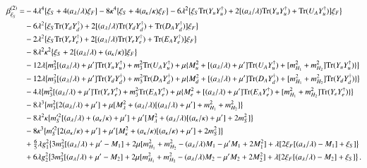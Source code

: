 \documentclass[final,3p,times]{elsarticle}
\newcommand{\lamsq}{\lambda^2}
\newcommand{\kapsq}{\kappa^2}
\newcommand{\tr}{\mathrm{Tr}}
\newcommand{\mhusq}{m^2_{H_2}}
\newcommand{\mhdsq}{m^2_{H_1}}
\newcommand{\mlamsq}{M_\lambda^2}
\newcommand{\mkapsq}{M_\kappa^2}
\newcommand{\mssq}{m_S^2}
\newcommand{\mtrisq}{m_3^2}
\newcommand{\msprsq}{m_S'^2}
\newcommand{\Alam}{a_\lambda/\lambda}
\newcommand{\Akap}{a_\kappa/\kappa}
\newcommand{\Musq}{M_u^2}
\newcommand{\Mdsq}{M_d^2}
\newcommand{\Mesq}{M_e^2}
\begin{document}
\begin{align}
\beta_{\xi^{}_S}^{(2)} =& -4\lambda^4\big\{ \xi_S + 4(\Alam)\xi_F\big\} 
- 8\kappa^4\big\{ \xi_S + 4(\Akap)\xi_F\big\} 
-6\lamsq\big\{ \xi_S\tr( Y_u Y_u^\dagger)+ 2[(\Alam)\tr( Y_u Y_u^\dagger) + \tr( U_A Y_u^\dagger)]\xi_F\big\} \notag \\
%
&-6\lamsq\big\{\xi_S\tr( Y_d Y_d^\dagger) + 2[(\Alam)\tr( Y_d Y_d^\dagger) + \tr( D_A Y_d^\dagger)]\xi_F\big\}  \notag \\
%
&-2\lamsq\big\{\xi_S\tr( Y_e Y_e^\dagger) + 2[(\Alam)\tr( Y_e Y_e^\dagger) + \tr( E_A Y_e^\dagger)]\xi_F\big\} \notag \\
%
&-8\lamsq\kapsq\big\{ \xi_S + 2[(\Alam) + (\Akap)]\xi_F\big\} \notag \\
%
&-12\lambda\big\{ \mtrisq[(\Alam) + \mu']\tr( Y_u Y_u^\dagger) + \mtrisq\tr( U_A Y_u^\dagger)
+ \mu\{\Musq + [(\Alam) + \mu']\tr( U_A Y_u^\dagger) + [\mhdsq + \mhusq]\tr( Y_u Y_u^\dagger)\} \big\} \notag \\
%
&-12\lambda\big\{ \mtrisq[(\Alam) + \mu']\tr( Y_d Y_d^\dagger) + \mtrisq\tr( D_A Y_d^\dagger)
+ \mu\{\Mdsq + [(\Alam) +\mu']\tr( D_A Y_d^\dagger) + [\mhdsq + \mhusq]\tr( Y_d Y_d^\dagger)\} \big\}  \notag \\
%
&-4\lambda\big\{ \mtrisq[(\Alam)+ \mu']\tr( Y_e Y_e^\dagger) + \mtrisq\tr( E_A Y_e^\dagger)
+ \mu\{\Mesq + [(\Alam) +\mu']\tr( E_A Y_e^\dagger) + [\mhdsq + \mhusq]\tr( Y_e Y_e^\dagger)\} \big\} \notag \\
%
&-8\lambda^3\big\{ \mtrisq[2(\Alam) + \mu'] + \mu[\mlamsq + (\Alam)[(\Alam) + \mu'] + \mhdsq + \mhusq]\big\} \notag \\
%
&-8\lamsq\kappa\big\{ \msprsq[(\Alam) + (\Akap) + \mu']
+ \mu'[\mlamsq + (\Alam)[(\Akap) + \mu'] + 2\mssq] \big\} \notag \\
%
&-8\kappa^3\big\{ \msprsq[2(\Akap) + \mu'] 
+ \mu'[\mkapsq + (\Akap)[(\Akap) + \mu'] + 2\mssq] \big\} \notag \\
%
&+ \tfrac{6}{5}\lambda g_1^2\big\{ 3\mtrisq[(\Alam) + \mu' - M_1]
+ 2\mu[\mhdsq + \mhusq -(\Alam)M_1 - \mu' M_1 + 2M_1^2] 
+ \lambda[2\xi_F[(\Alam) - M_1]  + \xi_S] \big\} \notag \\
%
&+ 6\lambda g_2^2\big\{ 3\mtrisq[(\Alam) + \mu' - M_2]
+ 2\mu[\mhdsq + \mhusq - (\Alam)M_2 - \mu' M_2 + 2M_2^2] 
+ \lambda[2\xi_F[(\Alam) - M_2] + \xi_S] \big\}\,.
\end{align}
\end{document}
